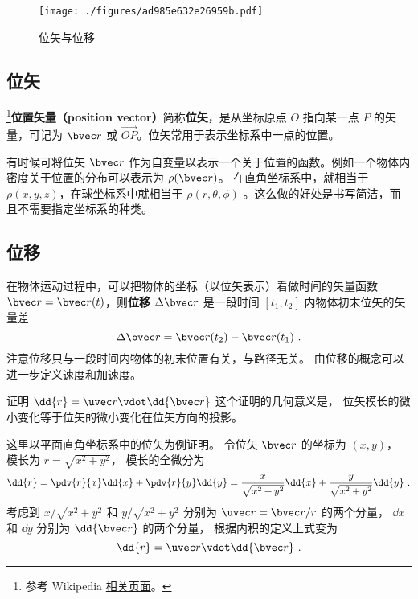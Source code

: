 

\begin{figure}[ht]
\centering
\texttt{[image: ./figures/ad985e632e26959b.pdf]}
\caption{位矢与位移} \label{fig_Disp_1}
\end{figure}

\subsection{位矢}

\footnote{参考 Wikipedia \href{https://en.wikipedia.org/wiki/Position_(geometry)}{相关页面}。}\textbf{位置矢量（position vector）}简称\textbf{位矢}，是从坐标原点 $O$ 指向某一点 $P$ 的矢量，可记为 $\bvec r$ 或 $\overrightarrow{OP}$。位矢常用于表示坐标系中一点的位置。

有时候可将位矢 $\bvec r$ 作为自变量以表示一个关于位置的函数。例如一个物体内密度关于位置的分布可以表示为 $\rho(\bvec r)$。 在直角坐标系中，就相当于 $\rho(x,y,z)$，在球坐标系中就相当于 $\rho(r,\theta,\phi)$ 。这么做的好处是书写简洁，而且不需要指定坐标系的种类。

\subsection{位移}
在物体运动过程中，可以把物体的坐标（以位矢表示）看做时间的矢量函数 $\bvec r=\bvec r(t)$，则\textbf{位移} $\Delta \bvec r$ 是一段时间 $[t_1,t_2]$ 内物体初末位矢的矢量差
\begin{equation}
\Delta \bvec r = \bvec r(t_2) - \bvec r(t_1)~.
\end{equation}
注意位移只与一段时间内物体的初末位置有关，与路径无关。 由位移的概念可以进一步定义速度和加速度。

\begin{example}{证明 $\dd{r} = \uvec r \vdot \dd{\bvec r}$}\label{ex_Disp_1}
这个证明的几何意义是， 位矢模长的微小变化等于位矢的微小变化在位矢方向的投影。

这里以平面直角坐标系中的位矢为例证明。 令位矢 $\bvec r$ 的坐标为 $(x, y)$， 模长为 $r = \sqrt{x^2 + y^2}$，
模长的全微分为
\begin{equation}
\dd{r} = \pdv{r}{x} \dd{x} + \pdv{r}{y} \dd{y} = \frac{x}{\sqrt{x^2 + y^2}} \dd{x} + \frac{y}{\sqrt{x^2 + y^2}} \dd{y}~.
\end{equation}
考虑到 $x/\sqrt{x^2 + y^2}$ 和 $y/\sqrt{x^2 + y^2}$ 分别为 $\uvec r = \bvec r/r$ 的两个分量， $\dd{x}$ 和 $\dd{y}$ 分别为 $\dd{\bvec r}$ 的两个分量， 根据内积的定义上式变为
\begin{equation}
\dd{r} = \uvec r \vdot \dd{\bvec r}~.
\end{equation}
\end{example}
